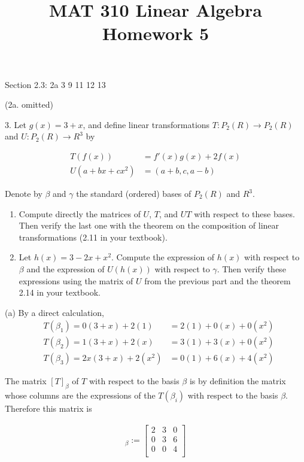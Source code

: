 \documentclass[12pt]{amsart}
\begin{document}
\title{MAT 310 Linear Algebra Homework 5}
\maketitle


Section 2.3: 2a 3 9 11 12 13

\vspace{1pc}

(2a. omitted)

\vspace{1pc}

3.  Let $g(x)=3+x$, and define linear transformations $T:P_2(R)\rightarrow P_2(R)$ and $U:P_2(R)\rightarrow R^3$ by

\begin{align*}
T(f(x)) &= f'(x)g(x)+2f(x)\\
U(a+bx+cx^2) &= (a+b,c,a-b)
\end{align*}

Denote by $\beta$ and $\gamma$ the standard (ordered) bases of $P_2(R)$ and $R^3$.

\begin{enumerate}[label=(\alph*)]
\item{Compute directly the matrices of $U$, $T$, and $UT$ with respect to these bases.  Then verify the last one with the theorem on the composition of linear transformations (2.11 in your textbook). }
\item{Let $h(x)=3-2x+x^2$.  Compute the expression of $h(x)$ with respect to $\beta$ and the expression of $U(h(x))$ with respect to $\gamma$.  Then verify these expressions using the matrix of $U$ from the previous part and the theorem 2.14 in your textbook.}
\end{enumerate}

\vspace{1pc}

(a) By a direct calculation,
\begin{align*}
& T(\beta_1)= 0(3+x)+2(1)   &= 2(1) + 0(x) + 0(x^2)\\
& T(\beta_2)= 1(3+x)+2(x)   &= 3(1) + 3(x) + 0(x^2)\\
& T(\beta_3)= 2x(3+x)+2(x^2) &= 0(1)+ 6(x) + 4(x^2)
\end{align*}

The matrix $[T]_\beta$ of $T$ with respect to the basis $\beta$ is by definition the matrix whose columns are the expressions of the $T(\beta_i)$ with respect to the basis $\beta$.  Therefore this matrix is

\begin{align*}
[T]_\beta := \begin{bmatrix}
2 & 3 & 0\\
0 & 3 & 6\\
0 & 0 & 4\\
\end{bmatrix}
\end{align*}
\end{document}
